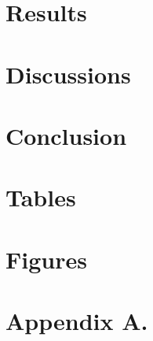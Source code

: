 \documentclass[12pt]{article}
\begin{document}
	     
	\section{Results} \label{sec:result}
	
	\section{Discussions} \label{sec:discussion}
	
	\section{Conclusion} \label{sec:conclusion}
	
	
	
	\singlespacing
	
	
	
	
	
	\clearpage
	
	\onehalfspacing
	
	\section*{Tables} \label{sec:tab}
	
		
	
	\clearpage
		
	\section*{Figures} \label{sec:fig}
	
	
	
	\clearpage
	
	\section*{Appendix A.} 
	\label{sec:appendixa}
	
\end{document}
